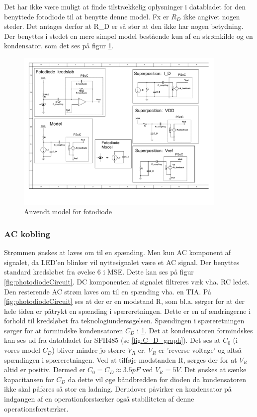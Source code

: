 \documentclass[HardwareDesign/HardwareDesign_main.tex]{subfiles}
\begin{document}
Det har ikke være muligt at finde tilstrækkelig oplysninger i databladet for den benyttede fotodiode til at benytte denne model. Fx er $R_D$ ikke angivet nogen steder. Det antages derfor at R\_D er så stor at den ikke har nogen betydning. Der benyttes i stedet en mere simpel model bestående kun af en strømkilde og en kondensator. som det ses på figur \ref{fig:photodiodeModelSimple}.

\begin{figure}[H]
    \centering
    \includegraphics[width=0.9\textwidth,trim={4.1in 2.1in 4.75in 4.7in},clip, page=1]{HardwareDesign/CupSensor/graphics/Superposition.pdf}
    \caption{Anvendt model for fotodiode}
    \label{fig:photodiodeModelSimple}
\end{figure}

\subsubsection{AC kobling}
Strømmen ønskes at laves om til en spænding. Men kun AC komponent af signalet, da LED'en blinker vil nyttesignalet være et AC signal. Der benyttes standard kredsløbet fra øvelse 6 i MSE. Dette kan ses på figur \ref{fig:photodiodeCircuit}. DC komponenten af signalet filtreres væk vha. RC ledet. Den resterende AC strøm laves om til en spænding vha. en TIA. På \ref{fig:photodiodeCircuit} ses at der er en modstand R, som bl.a. sørger for at der hele tiden er påtrykt en spænding i spæreretningen. Dette er en af ændringerne i forhold til kredsløbet fra teknologiundersøgelsen. Spændingen i spæreretningen sørger for at formindske kondensatoren $C_D$ i \ref{fig:photodiodeModelSimple}. Det at kondensatoren formindskes kan ses ud fra databladet for SFH485 (se \ref{fig:C_D_graph}). Det ses at $C_0$ (i vores model $C_D$) bliver mindre jo større $V_R$ er. $V_R$ er 'reverse voltage' og altså spændingen i spæreretningen. Ved at tilføje modstanden R, sørges der for at $V_R$ altid er positiv. Dermed er $C_0 = C_D \approx 3.5\si{pF}$ ved $V_R=5\si{V}$. Det ønskes at sænke kapacitansen for $C_D$ da dette vil øge båndbredden for dioden da kondensatoren ikke skal påføres så stor en ladning. Derudover påvirker en kondensator på indgangen af en operationforstærker også stabiliteten af denne operationsforstærker.
\end{document}
